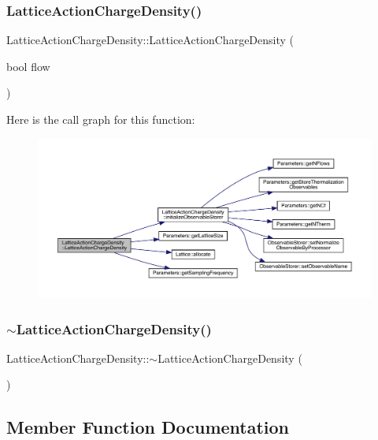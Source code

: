 \subsubsection{\texorpdfstring{LatticeActionChargeDensity()}{LatticeActionChargeDensity()}}
{\footnotesize\ttfamily Lattice\+Action\+Charge\+Density\+::\+Lattice\+Action\+Charge\+Density (\begin{DoxyParamCaption}\item[{bool}]{flow }\end{DoxyParamCaption})}

Here is the call graph for this function\+:\nopagebreak
\begin{figure}[H]
\begin{center}
\leavevmode
\includegraphics[width=350pt]{class_lattice_action_charge_density_acda2a43db75cca34586441d4ac7ec39e_cgraph}
\end{center}
\end{figure}
\mbox{\label{class_lattice_action_charge_density_a72679dfadb215889401f5403909b7b93}} 
\subsubsection{\texorpdfstring{$\sim$LatticeActionChargeDensity()}{~LatticeActionChargeDensity()}}
{\footnotesize\ttfamily Lattice\+Action\+Charge\+Density\+::$\sim$\+Lattice\+Action\+Charge\+Density (\begin{DoxyParamCaption}{ }\end{DoxyParamCaption})}



\subsection{Member Function Documentation}
\mbox{\label{class_lattice_action_charge_density_a3dddc75188042c645fbdd1c8b3e80c8a}} 
